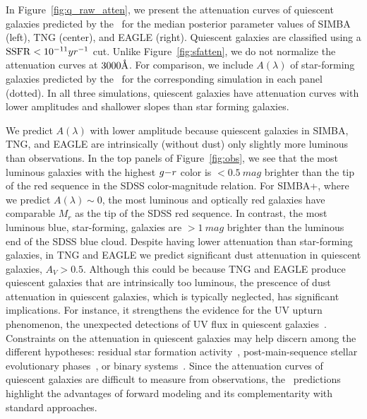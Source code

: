 In Figure~\ref{fig:q_raw_atten}, we present the attenuation curves of
quiescent galaxies predicted by the \eda~for the median posterior parameter
values of SIMBA (left), TNG (center), and EAGLE (right). 
Quiescent galaxies are classified using a ${\rm SSFR} < 10^{-11}{yr}^{-1}$ cut. 
Unlike Figure~\ref{fig:sfatten}, we do not normalize the attenuation curves at
$3000\AA$.  
For comparison, we include $A(\lambda)$ of star-forming galaxies predicted
by the \eda~for the corresponding simulation in each panel (dotted).
In all three simulations, quiescent galaxies have attenuation curves with
lower amplitudes and shallower slopes than star forming galaxies.

We predict $A(\lambda)$ with lower amplitude because quiescent galaxies in
SIMBA, TNG, and EAGLE are intrinsically (without dust) only slightly more
luminous than observations. 
In the top panels of Figure~\ref{fig:obs}, we see that the most luminous
galaxies with the highest $g{-}r$ color is $<0.5~mag$ brighter than the tip of
the red sequence in the SDSS color-magnitude relation. 
For SIMBA+\eda, where we predict $A(\lambda) \sim 0$, the most luminous and
optically red galaxies have comparable $M_r$ as the tip of the SDSS red sequence.
In contrast, the most luminous blue, star-forming, galaxies are $>1~mag$
brighter than the luminous end of the SDSS blue cloud.
Despite having lower attenuation than star-forming galaxies, in TNG and
EAGLE we predict significant dust attenuation in quiescent galaxies, $A_V > 0.5$.
Although this could be because TNG and EAGLE produce quiescent galaxies that
are intrinsically too luminous, the prescence of dust attenuation in quiescent
galaxies, which is typically neglected, has significant implications.  
For instance, it strengthens the evidence for the UV upturn phenomenon, the
unexpected detections of UV flux in quiescent galaxies~\citep[\eg][]{code1969,
oconnell1999, lecras2016, ali2018, dantas2021}. 
Constraints on the attenuation in quiescent galaxies may help discern
among the different hypotheses: residual star formation
activity~\citep[\eg~][]{kaviraj2007}, post-main-sequence stellar evolutionary
phases~\citep[\eg~][]{yi1997}, or binary systems~\citep[\eg~][]{han2007}.
Since the attenuation curves of quiescent galaxies are difficult to measure
from observations, the \eda~predictions highlight the advantages of
forward modeling and its complementarity with standard approaches. 

